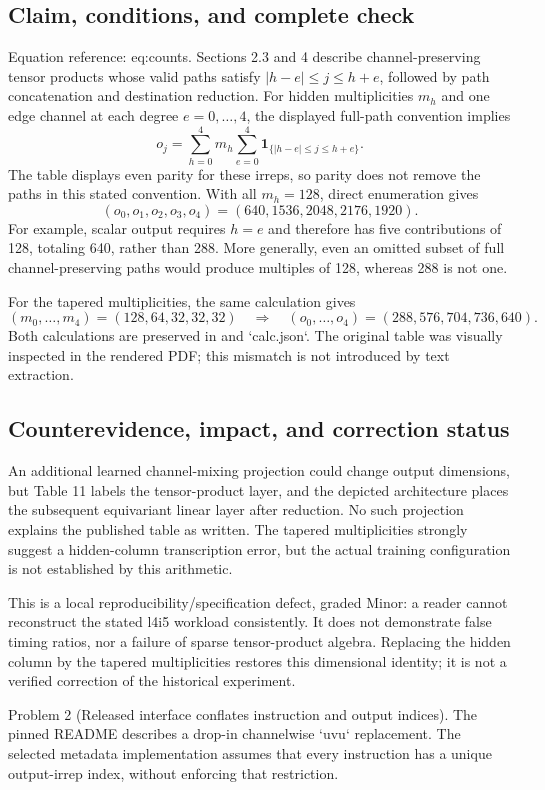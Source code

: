 \documentclass[10pt]{article}
\begin{document}
\subsection*{Claim, conditions, and complete check}
Equation reference: eq:counts. Sections 2.3 and 4 describe channel-preserving tensor products whose valid paths satisfy \(|h-e|\le j\le h+e\), followed by path concatenation and destination reduction. For hidden multiplicities \(m_h\) and one edge channel at each degree \(e=0,\ldots,4\), the displayed full-path convention implies \[
o_j=\sum_{h=0}^4 m_h\sum_{e=0}^4
\mathbf1_{\{|h-e|\le j\le h+e\}} .\] The table displays even parity for these irreps, so parity does not remove the paths in this stated convention. With all \(m_h=128\), direct enumeration gives \[(o_0,o_1,o_2,o_3,o_4)=(640,1536,2048,2176,1920).\] For example, scalar output requires \(h=e\) and therefore has five contributions of 128, totaling 640, rather than 288. More generally, even an omitted subset of full channel-preserving paths would produce multiples of 128, whereas 288 is not one.\par
For the tapered multiplicities, the same calculation gives \[(m_0,\ldots,m_4)=(128,64,32,32,32)
\quad\Longrightarrow\quad(o_0,\ldots,o_4)=(288,576,704,736,640).\] Both calculations are preserved in and `calc.json`. The original table was visually inspected in the rendered PDF; this mismatch is not introduced by text extraction.\par
\subsection*{Counterevidence, impact, and correction status}
An additional learned channel-mixing projection could change output dimensions, but Table 11 labels the tensor-product layer, and the depicted architecture places the subsequent equivariant linear layer after reduction. No such projection explains the published table as written. The tapered multiplicities strongly suggest a hidden-column transcription error, but the actual training configuration is not established by this arithmetic.\par
This is a local reproducibility/specification defect, graded Minor: a reader cannot reconstruct the stated l4i5 workload consistently. It does not demonstrate false timing ratios, nor a failure of sparse tensor-product algebra. Replacing the hidden column by the tapered multiplicities restores this dimensional identity; it is not a verified correction of the historical experiment.\par
Problem 2 (Released interface conflates instruction and output indices).  The pinned README describes a drop-in channelwise `uvu` replacement. The selected metadata implementation assumes that every instruction has a unique output-irrep index, without enforcing that restriction.\par
\end{document}
